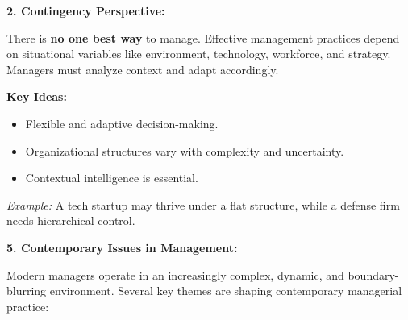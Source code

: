 \documentclass[12pt,a4paper]{book}
\begin{document}
\vspace{0.5cm}

\textbf{2. Contingency Perspective:}

There is \textbf{no one best way} to manage. Effective management practices depend on situational variables like environment, technology, workforce, and strategy. Managers must analyze context and adapt accordingly.

\textbf{Key Ideas:}
\begin{itemize}
    \item Flexible and adaptive decision-making.
    \item Organizational structures vary with complexity and uncertainty.
    \item Contextual intelligence is essential.
\end{itemize}

\textit{Example:} A tech startup may thrive under a flat structure, while a defense firm needs hierarchical control.

\vspace{0.5cm}

\textbf{5. Contemporary Issues in Management:}

Modern managers operate in an increasingly complex, dynamic, and boundary-blurring environment. Several key themes are shaping contemporary managerial practice:
\end{document}
